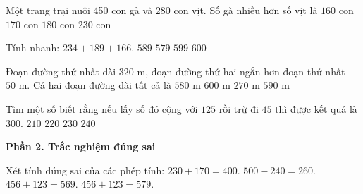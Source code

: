 \begin{ex} %
Một trang trại nuôi 450 con gà và 280 con vịt. Số gà nhiều hơn số vịt là
\choice
{$160$ con}
{\True $170$ con}
{$180$ con}
{$230$ con}
\end{ex}

\begin{ex} %
Tính nhanh: $234 + 189 + 166$.
\choice
{\True $589$}
{$579$}
{$599$}
{$600$}
\end{ex}

\begin{ex} %
Đoạn đường thứ nhất dài $320\text{ m}$, đoạn đường thứ hai ngắn hơn đoạn thứ nhất $50\text{ m}$. Cả hai đoạn đường dài tất cả là
\choice
{$580\text{ m}$}
{$600\text{ m}$}
{$270\text{ m}$}
{\True $590\text{ m}$}
\end{ex}

\begin{ex} %
Tìm một số biết rằng nếu lấy số đó cộng với $125$ rồi trừ đi $45$ thì được kết quả là $300$.
\choice
{$210$}
{\True $220$}
{$230$}
{$240$}
\end{ex}

\textbf{Phần 2. Trắc nghiệm đúng sai}

\begin{ex} %
Xét tính đúng sai của các phép tính:
\choiceTF
{\True $230 + 170 = 400$.}
{\True $500 - 240 = 260$.}
{$456 + 123 = 569$.}
{\True $456 + 123 = 579$.}
\end{ex}

